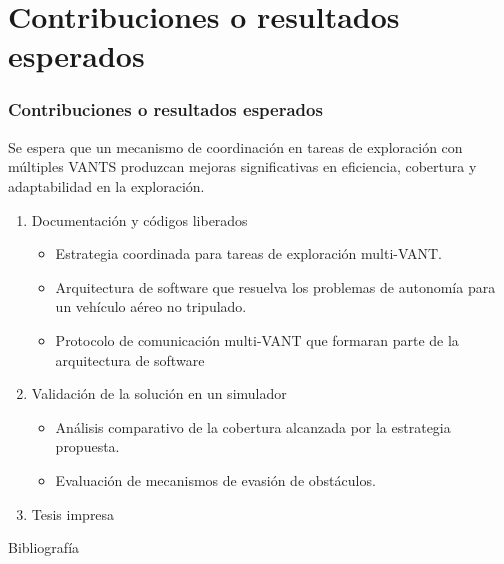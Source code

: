 \documentclass[
  24pt, %
  aspectratio=169, %
]{beamer}
\begin{document}
\section{Contribuciones o resultados esperados}
\begin{frame}
  \frametitle{Contribuciones o resultados esperados}
  Se espera que un mecanismo de coordinación en tareas de exploración con múltiples VANTS produzcan mejoras significativas en eficiencia, cobertura y adaptabilidad en la exploración.
  \begin{enumerate}
  \item<1-> Documentación y códigos liberados
    \begin{itemize}
    \item Estrategia coordinada para tareas de exploración multi-VANT.
    \item Arquitectura de software que resuelva los problemas de autonomía para un vehículo aéreo no tripulado.
    \item Protocolo de comunicación multi-VANT que formaran parte de la arquitectura de software
    \end{itemize}
  \item<2-> Validación de la solución en un simulador
    \begin{itemize}
    \item Análisis comparativo de la cobertura alcanzada por la estrategia propuesta.
    \item Evaluación de mecanismos de evasión de obstáculos.
    \end{itemize}
  \item<3-> Tesis impresa
  \end{enumerate}
\end{frame}

\begin{frame}{Bibliografía}
  \tiny
  
  
\end{frame}
\end{document}
